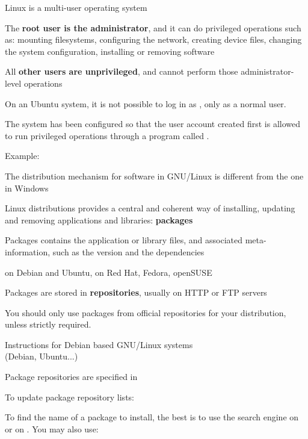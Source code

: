   \startitemize
  \item Linux is a multi-user operating system
    \startitemize
    \item The {\bf root user is the administrator}, and it can do
      privileged operations such as: mounting filesystems, configuring
      the network, creating device files, changing the system
      configuration, installing or removing software
    \item All {\bf other users are unprivileged}, and cannot perform
      those administrator-level operations
    \stopitemize
  \item On an Ubuntu system, it is not possible to log in as
    , only as a normal user.
  \item The system has been configured so that the user account
    created first is allowed to run privileged operations through a
    program called .\\
    \startitemize
    \item Example: 
    \stopitemize
  \stopitemize

  \startitemize
  \item The distribution mechanism for software in GNU/Linux is
    different from the one in Windows
  \item Linux distributions provides a central and coherent way of
    installing, updating and removing applications and libraries:
    {\bf packages}
  \item Packages contains the application or library files, and
    associated meta-information, such as the version and the
    dependencies
    \startitemize
    \item {} on Debian and Ubuntu,  on Red Hat,
      Fedora, openSUSE
    \stopitemize
  \item Packages are stored in {\bf repositories}, usually on HTTP or
    FTP servers
  \item You should only use packages from official repositories for your
    distribution, unless strictly required.
\stopitemize

  Instructions for Debian based GNU/Linux systems\\
  (Debian, Ubuntu...)
  \startitemize
  \item Package repositories are specified in 
  \item To update package repository lists:\\
  \item To find the name of a package to install, the best is to use
    the search engine on  or on
    . You may
    also use:\\
  \stopitemize

